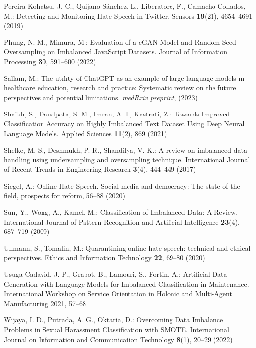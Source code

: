 \documentclass[runningheads]{llncs}
\begin{document}
\begin{thebibliography}{33}
Pereira-Kohatsu, J. C., Quijano-Sánchez, L., Liberatore, F., Camacho-Collados, M.: Detecting and Monitoring Hate Speech in Twitter. Sensors \textbf{19}(21), 4654--4691 (2019)

Phung, N. M., Mimura, M.: Evaluation of a cGAN Model and Random Seed Oversampling on Imbalanced JavaScript Datasets. Journal of Information Processing \textbf{30}, 591--600 (2022)

Sallam, M.: The utility of ChatGPT as an example of large language models in healthcare education, research and practice: Systematic review on the future perspectives and potential limitations. \emph{medRxiv preprint}, (2023)

Shaikh, S., Daudpota, S. M., Imran, A. I., Kastrati, Z.: Towards Improved Classification Accuracy on Highly Imbalanced Text Dataset Using Deep Neural Language Models. Applied Sciences \textbf{11}(2), 869 (2021)

Shelke, M. S., Deshmukh, P. R., Shandilya, V. K.: A review on imbalanced data handling using undersampling and oversampling technique. International Journal of Recent Trends in Engineering Research \textbf{3}(4), 444--449 (2017)

Siegel, A.: Online Hate Speech. Social media and democracy: The state of the field, prospects for reform, 56--88 (2020)

Sun, Y., Wong, A., Kamel, M.: Classification of Imbalanced Data: A Review. International Journal of Pattern Recognition and Artificial Intelligence \textbf{23}(4), 687--719 (2009)

Ullmann, S., Tomalin, M.: Quarantining online hate speech: technical and ethical perspectives. Ethics and Information Technology \textbf{22}, 69--80 (2020)

Usuga-Cadavid, J. P., Grabot, B., Lamouri, S., Fortin, A.: Artificial Data Generation with Language Models for Imbalanced Classification in Maintenance. International Workshop on Service Orientation in Holonic and Multi-Agent Manufacturing 2021, 57--68

Wijaya, I. D., Putrada, A. G., Oktaria, D.: Overcoming Data Imbalance Problems in Sexual Harassment Classification with SMOTE. International Journal on Information and Communication Technology \textbf{8}(1), 20--29 (2022)

\end{thebibliography}
\end{document}
